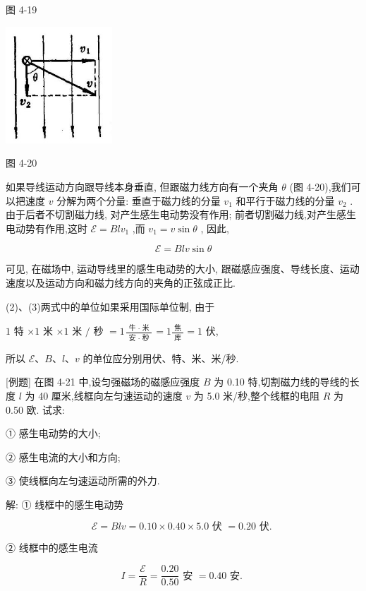 \documentclass[10pt]{article}
\begin{document}
图 4-19

\begin{center}
\includegraphics[max width=0.3\textwidth]{images/01913056-1f15-74d8-9184-9aab52c9d66b_144_314226.jpg}
\end{center}

图 4-20

如果导线运动方向跟导线本身垂直, 但跟磁力线方向有一个夹角 \(\theta\) (图 4-20),我们可以把速度 \(v\) 分解为两个分量: 垂直于磁力线的分量 \({v}_{1}\) 和平行于磁力线的分量 \({v}_{2}\) . 由于后者不切割磁力线, 对产生感生电动势没有作用; 前者切割磁力线,对产生感生电动势有作用,这时 \(\mathcal{E} = {Bl}{v}_{1}\) ,而 \({v}_{1} = v\sin \theta\) , 因此,

\[
\mathcal{E} = {Blv}\sin \theta \tag{3}
\]

可见, 在磁场中, 运动导线里的感生电动势的大小, 跟磁感应强度、导线长度、运动速度以及运动方向和磁力线方向的夹角的正弦成正比.

(2)、(3)两式中的单位如果采用国际单位制, 由于

\(1\) 特 \(\times 1\) 米 \(\times 1\) 米 \(/\) 秒 \(= 1\frac{\text{ 牛 } \cdot \text{ 米 }}{\text{ 安 } \cdot \text{ 秒 }} = 1\frac{\text{ 焦 }}{\text{ 库 }} = 1\) 伏,

所以 \(\mathcal{E}\text{、}B\text{、}l\text{、}v\) 的单位应分别用伏、特、米、米/秒.

[例题] 在图 4-21 中,设匀强磁场的磁感应强度 \(B\) 为 0.10 特,切割磁力线的导线的长度 \(l\) 为 40 厘米,线框向左匀速运动的速度 \(v\) 为 5.0 米/秒,整个线框的电阻 \(R\) 为 0.50 欧. 试求:

① 感生电动势的大小;

② 感生电流的大小和方向;

③ 使线框向左匀速运动所需的外力.

解: ① 线框中的感生电动势

\[
\mathcal{E} = {Blv} = {0.10} \times {0.40} \times {5.0}\text{ 伏 } = {0.20}\text{ 伏. }
\]

② 线框中的感生电流

\[
I = \frac{\mathcal{E}}{R} = \frac{0.20}{0.50}\text{ 安 } = {0.40}\text{ 安. }
\]
\end{document}
